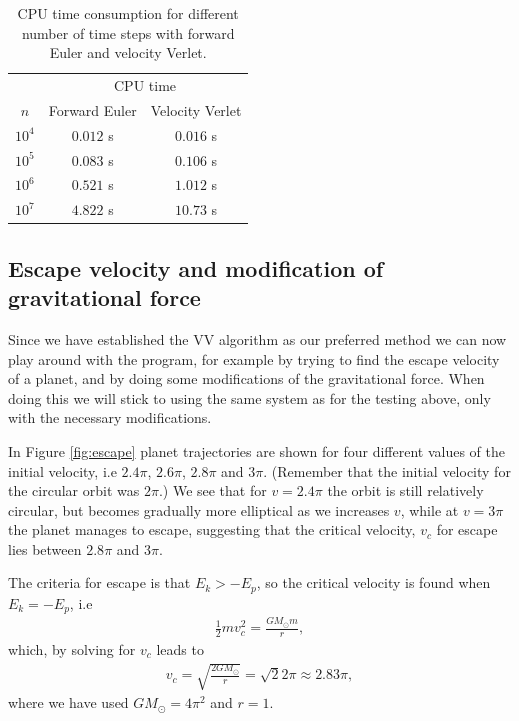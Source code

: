 \documentclass[12pt, a4paper]{article}
\begin{document}
\begin{table}[ht!]
\caption{CPU time consumption for different number of time steps with forward Euler and velocity Verlet.}
\label{tab:CPUtime}
\begin{center}
\begin{tabular}{ccc} \\ \hline \hline 
	&\multicolumn{2}{c}{CPU time} \\
$n$ & Forward Euler & Velocity Verlet \\ \hline  
$10^4$ & $0.012$ s & $0.016$ s \\ 
$10^5$ & $0.083$ s & $0.106$ s \\ 
$10^6$ & $0.521$ s & $1.012$ s \\ 
$10^7$ & $4.822$ s & $10.73$ s \\ \hline\hline 
\end{tabular}
\end{center}
\end{table}

\subsection{Escape velocity and modification of gravitational force}

Since we have established the VV algorithm as our preferred method we can now play around with the 
program, for example by trying to find the escape velocity of a planet, and by doing some modifications of 
the gravitational force. When doing this we will stick to using the same system as for the testing 
above, only with the necessary modifications. 

In Figure \ref{fig:escape} planet trajectories are shown for four different values of the initial 
velocity, i.e $2.4\pi$, $2.6\pi$, $2.8\pi$ and $3\pi$. (Remember that the initial velocity for the 
circular orbit was $2\pi$.) We see that for $v=2.4\pi$ the orbit is still relatively circular, but 
becomes gradually more elliptical as we increases $v$, while at $v=3\pi$ the planet manages to escape, 
suggesting that the critical velocity, $v_c$ for escape lies between $2.8\pi$ and $3\pi$.  

The criteria for escape is that $E_k > -E_p$, so the critical velocity is found when $E_k = -E_p$, i.e 
\begin{align*}
\frac{1}{2}mv_c^2 = \frac{GM_{\odot}m}{r}, 
\end{align*}
which, by solving for $v_c$ leads to 
\begin{align*}
v_c = \sqrt{\frac{2GM_{\odot}}{r}} = \sqrt{2}2\pi \approx 2.83\pi, 
\end{align*}
where we have used $GM_{\odot} = 4\pi^2$ and $r=1$. 
\end{document}
